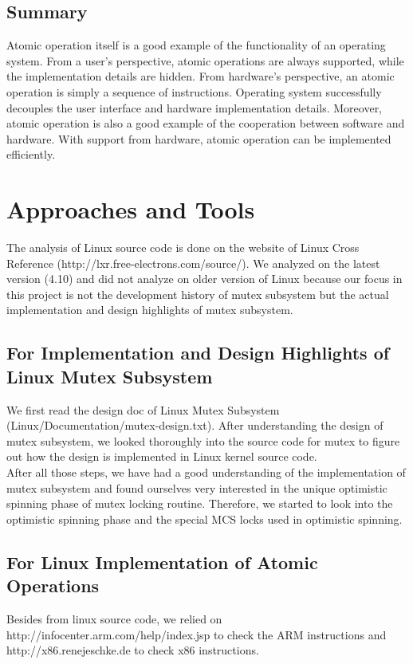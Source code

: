 \documentclass[10pt]{sigplanconf}
\begin{document}
\subsection{Summary}
Atomic operation itself is a good example of the functionality of an operating system. From a user's perspective, atomic operations are always supported, while the implementation details are hidden. From hardware's perspective, an atomic operation is simply a sequence of instructions. Operating system successfully decouples the user interface and hardware implementation details. Moreover, atomic operation is also a good example of the cooperation between software and hardware. With support from hardware, atomic operation can be implemented efficiently. \\

\vspace{50pt}

\section{Approaches and Tools}
The analysis of Linux source code is done on the website of Linux Cross Reference (http://lxr.free-electrons.com/source/). We analyzed on the latest version (4.10) and did not analyze on older version of Linux because our focus in this project is not the development history of mutex subsystem but the actual implementation and design highlights of mutex subsystem.\\
\subsection{For Implementation and Design Highlights of Linux Mutex Subsystem}
We first read the design doc of Linux Mutex Subsystem (Linux/Documentation/mutex-design.txt). After understanding the design of mutex subsystem, we looked thoroughly into the source code for mutex to figure out how the design is implemented in Linux kernel source code. \\
After all those steps, we have had a good understanding of the implementation of mutex subsystem and found ourselves very interested in the unique optimistic spinning phase of mutex locking routine. Therefore, we started to look into the optimistic spinning phase and the special MCS locks used in optimistic spinning. \\

\subsection{For Linux Implementation of Atomic Operations}
Besides from linux source code, we relied on\\ http://infocenter.arm.com/help/index.jsp to check the ARM instructions and http://x86.renejeschke.de to check x86 instructions. \\
\end{document}
